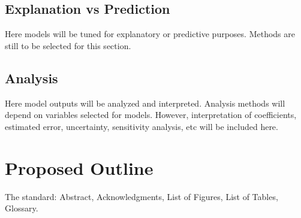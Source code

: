 \documentclass[12pt]{extarticle}
\begin{document}
\subsection{Explanation vs Prediction}
Here models will be tuned for explanatory or predictive purposes. Methods are still to be selected for this section.


\subsection{Analysis}
Here model outputs will be analyzed and interpreted. Analysis methods will depend on variables selected for models. However, interpretation of coefficients, estimated error, uncertainty, sensitivity analysis, etc will be included here.  



\section{Proposed Outline}
The standard: Abstract,       
Acknowledgments,  
List of Figures, 
List of Tables, 
Glossary.
\end{document}
